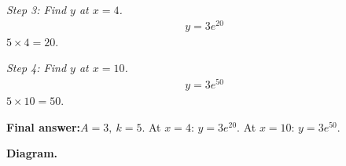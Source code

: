 \documentclass[11pt]{article}
\begin{document}
\textit{Step 3: Find \( y \) at \( x = 4 \).}
\[\begin{gathered}
y = 3e^{20}
\end{gathered}\]
\( 5 \times 4 = 20 \).

\textit{Step 4: Find \( y \) at \( x = 10 \).}
\[\begin{gathered}
y = 3e^{50}
\end{gathered}\]
\( 5 \times 10 = 50 \).

\begin{answerbox}
\textbf{Final answer:}\quad \(\displaystyle  A = 3,\ k = 5 \). At \(\displaystyle  x = 4 \): \(\displaystyle  y = 3e^{20} \). At \(\displaystyle  x = 10 \): \(\displaystyle  y = 3e^{50} \).
\end{answerbox}
\textbf{Diagram.}

\begin{center}
\end{center}
\end{document}
